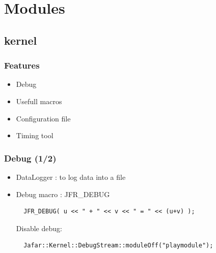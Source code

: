 \documentclass[compress]{beamer}
\begin{document}

\section{Modules}


\subsection{kernel}

\begin{frame}
  \frametitle{Features}
  \begin{itemize}
   \item Debug
   \item Usefull macros
   \item Configuration file
   \item Timing tool
  \end{itemize}
\end{frame}


\begin{frame}[fragile]
  \frametitle{Debug (1/2)}
  \begin{itemize}
    \item<1-> DataLogger : to log data into a file
    \item<2-> Debug macro : JFR\_DEBUG
      \begin{lstlisting}
  JFR_DEBUG( u << " + " << v << " = " << (u+v) );
      \end{lstlisting}
      Disable debug:
      \begin{lstlisting}
  Jafar::Kernel::DebugStream::moduleOff("playmodule");
      \end{lstlisting}
  \end{itemize}
\end{frame}
\end{document}

